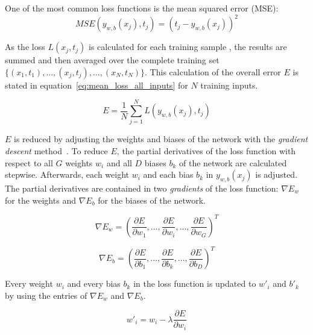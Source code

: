 One of the most common loss functions is the mean squared error (MSE):
\begin{equation}
MSE(y_{w,b}(x_j), t_j) = (t_j-y_{w,b}(x_j))^2
\label{eq:mean_sq_error}
\end{equation}

As the loss $L(x_j,t_j)$ is calculated for each training sample , the results are summed and then averaged over the complete training set $\{(x_1,t_1),...,(x_j,t_j),...,(x_N,t_N)\}$. This calculation of the overall error $E$ is stated in equation~\ref{eq:mean_loss_all_inputs} for $N$ training inputs.

\begin{equation}
E = \frac{1}{N} \sum_{j=1}^N L(y_{w,b}(x_j), t_j)
\label{eq:mean_loss_all_inputs}
\end{equation}

$E$ is reduced by adjusting the weights and biases of the network with the \emph{gradient descent} method~\cite{backprop_grad_desc_closed1993shun}. 
To reduce $E$, the partial derivatives of the loss function with respect to all $G$ weights $w_i$ and all $D$ biases $b_k$ of the network are calculated stepwise.
Afterwards, each weight $w_i$ and each bias $b_k$ in $y_{w,b}(x_j)$ is adjusted.
The partial derivatives are contained in two \emph{gradients} of the loss function: $\nabla E_{w}$ for the weights and $\nabla E_{b}$ for the biases of the network.

\begin{equation}
\nabla E_{w} = \left(\frac{\partial E}{\partial w_1} , ... ,\frac{\partial E}{\partial w_i}, ... , \frac{\partial E}{\partial w_G}\right)^T
\label{eq:gradient_weights}
\end{equation}

\begin{equation}
\nabla E_{b} = \left(\frac{\partial E}{\partial b_1} , ... , \frac{\partial E}{\partial b_k}, ... , \frac{\partial E}{\partial b_D}\right)^T
\label{eq:gradient_biases}
\end{equation}

Every weight $w_i$ and every bias $b_k$ in the loss function is updated to $w'_i$ and $b'_k$ by using the entries of $\nabla E_{w}$ and $\nabla E_{b}$.

\begin{equation}
w'_i = w_i - \lambda \frac{\partial E}{\partial w_i} 
\label{eq:update_weight} 
\end{equation}

